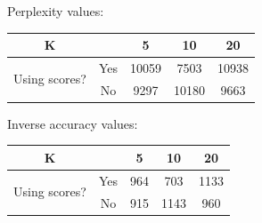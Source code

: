 \documentclass[a4paper,10pt]{report}
\begin{document}
Perplexity values:



\begin{center}
	\begin{tabular}{cc|ccc}
	K &  & 5 & 10 & 20 \\ \hline
	\multirow{2}{*}{Using scores?} & Yes & 10059 & 7503 & 10938   \\
	& No  & 9297 & 10180 & 9663   \\
	\end{tabular}
\end{center}

Inverse accuracy values:

\begin{center}
	\begin{tabular}{cc|ccc}
	K &  & 5 & 10 & 20 \\ \hline
	\multirow{2}{*}{Using scores?} & Yes & 964 & 703 & 1133   \\
	& No  & 915 & 1143 & 960   \\
	\end{tabular}
\end{center}
\end{document}
